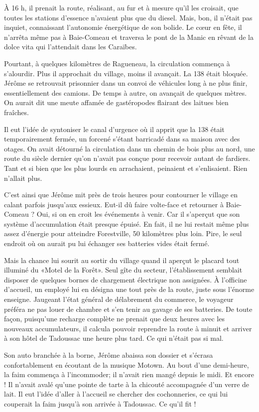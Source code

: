À 16 h, il prenait la route, réalisant, au fur et à mesure qu’il les croisait, que toutes les stations d’essence n’avaient plus que du diesel. Mais, bon, il n’était pas inquiet, connaissant l’autonomie énergétique de son bolide. Le cœur en fête, il n’arrêta même pas à Baie-Comeau et traversa le pont de la Manic en rêvant de la dolce vita qui l’attendait dans les Caraïbes.

Pourtant, à quelques kilomètres de Ragueneau, la circulation commença à s’alourdir. Plus il approchait du village, moins il avançait. La 138 était bloquée. Jérôme se retrouvait prisonnier dans un convoi de véhicules long à ne plus finir, essentiellement des camions. De temps à autre, on avançait de quelques mètres. On aurait dit une meute affamée de gastéropodes flairant des laitues bien fraîches.

Il eut l’idée de syntoniser le canal d’urgence où il apprit que la 138 était temporairement fermée, un forcené s’étant barricadé dans sa maison avec des otages. On avait détourné la circulation dans un chemin de bois plus au nord, une route du siècle dernier qu’on n’avait pas conçue pour recevoir autant de fardiers. Tant et si bien que les plus lourds en arrachaient, peinaient et s’enlisaient. Rien n’allait plus.

C’est ainsi que Jérôme mit près de trois heures pour contourner le village en calant parfois jusqu’aux essieux. Eut-il dû faire volte-face et retourner à Baie-Comeau ? Oui, si on en croit les événements à venir. Car il s’aperçut que son système d’accumulation était presque épuisé. En fait, il ne lui restait même plus assez d’énergie pour atteindre Forestville, 50 kilomètres plus loin. Pire, le seul endroit où on aurait pu lui échanger ses batteries vides était fermé.

Mais la chance lui sourit au sortir du village quand il aperçut le placard tout illuminé du «Motel de la Forêt». Seul gîte du secteur, l’établissement semblait disposer de quelques bornes de chargement électrique non assignées. À l’officine d’accueil, un employé lui en désigna une tout près de la route, juste sous l’énorme enseigne. Jaugeant l’état général de délabrement du commerce, le voyageur préféra ne pas louer de chambre et s’en tenir au gavage de ses batteries. De toute façon, puisqu’une recharge complète ne prenait que deux heures avec les nouveaux accumulateurs, il calcula pouvoir reprendre la route à minuit et arriver à son hôtel de Tadoussac une heure plus tard. Ce qui n’était pas si mal.

Son auto branchée à la borne, Jérôme abaissa son dossier et s’écrasa confortablement en écoutant de la musique Motown. Au bout d’une demi-heure, la faim commença à l’incommoder; il n’avait rien mangé depuis le midi. Et encore ! Il n’avait avalé qu’une pointe de tarte à la chicouté accompagnée d’un verre de lait. Il eut l’idée d’aller à l’accueil se chercher des cochonneries, ce qui lui couperait la faim jusqu’à son arrivée à Tadoussac. Ce qu’il fit !

